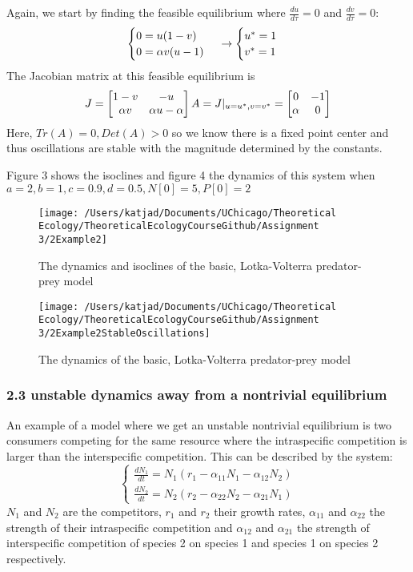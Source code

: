 \documentclass[
]{article}
\begin{document}
Again, we start by finding the feasible equilibrium where
\(\frac{du}{d\tau}=0\) and \(\frac{dv}{d\tau}=0\): \[
\begin{cases}
0=u(1-v)\\
0=\alpha v(u-1)
\end{cases}\\
\rightarrow \begin{cases}
u^*=1\\
v^*=1
\end{cases}
\] The Jacobian matrix at this feasible equilibrium is \[
J=
\begin{bmatrix}
1-v & -u\\
\alpha v & \alpha u-\alpha
\end{bmatrix}\\
A=J|_{u=u^*,v=v^*}=
\begin{bmatrix}
0 & -1\\
\alpha & 0
\end{bmatrix}
\] Here, \(Tr(A)=0,Det(A)>0\) so we know there is a fixed point center
and thus oscillations are stable with the magnitude determined by the
constants.

Figure 3 shows the isoclines and figure 4 the dynamics of this system
when \(a=2, b=1, c=0.9, d=0.5, N[0]=5, P[0]=2\)

\begin{figure}
\centering
\texttt{[image: /Users/katjad/Documents/UChicago/Theoretical Ecology/TheoreticalEcologyCourseGithub/Assignment 3/2Example2]}
\caption{The dynamics and isoclines of the basic, Lotka-Volterra
predator-prey model}
\end{figure}

\begin{figure}
\centering
\texttt{[image: /Users/katjad/Documents/UChicago/Theoretical Ecology/TheoreticalEcologyCourseGithub/Assignment 3/2Example2StableOscillations]}
\caption{The dynamics of the basic, Lotka-Volterra predator-prey model}
\end{figure}

\hypertarget{unstable-dynamics-away-from-a-nontrivial-equilibrium}{%
\subsubsection{2.3 unstable dynamics away from a nontrivial
equilibrium}\label{unstable-dynamics-away-from-a-nontrivial-equilibrium}}

An example of a model where we get an unstable nontrivial equilibrium is
two consumers competing for the same resource where the intraspecific
competition is larger than the interspecific competition. This can be
described by the system: \[
\begin{cases}
\frac{dN_1}{dt}=N_1(r_1-\alpha_{11}N_1-\alpha_{12}N_2)\\
\frac{dN_2}{dt}=N_2(r_2-\alpha_{22}N_2-\alpha_{21}N_1)
\end{cases}
\] \(N_1\) and \(N_2\) are the competitors, \(r_1\) and \(r_2\) their
growth rates, \(\alpha_{11}\) and \(\alpha_{22}\) the strength of their
intraspecific competition and \(\alpha_{12}\) and \(\alpha_{21}\) the
strength of interspecific competition of species 2 on species 1 and
species 1 on species 2 respectively.
\end{document}
